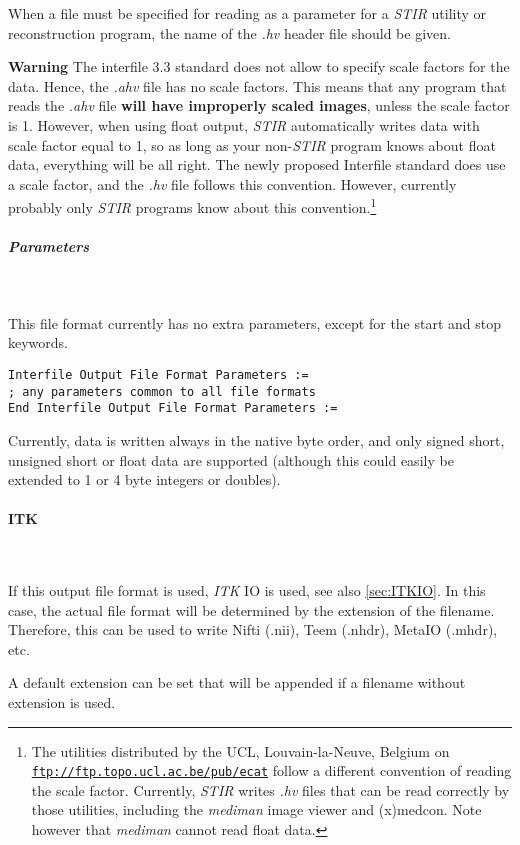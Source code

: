 \documentclass{article}
\def\url#1#2{\mbox{\href{#1}{\tt #2}}}
\newcommand{\subsubsubsection}[1]{\paragraph{#1}\mbox{} \\}
\newcommand{\subsubsubsubsection}[1]{\subparagraph{#1} \mbox{} \\}
\begin{document}
{{When a file must be specified for reading as a parameter for 
a \textit{STIR} utility or reconstruction program, the name of the \textit{.hv} 
header file should be given. 



\textbf{Warning} The interfile 3.3 standard does not allow to specify 
scale factors for the data. Hence, the \textit{.ahv} file has no scale 
factors. This means that any program that reads the \textit{.ahv} 
file \textbf{will have improperly scaled images}, unless the scale 
factor is 1. However, when using float output, \textit{STIR} automatically 
writes data with scale factor equal to 1, so as long as your 
non-\textit{STIR} program knows about float data, everything will 
be all right. The newly proposed Interfile standard does use 
a scale factor, and the \textit{.hv} file follows this convention. 
However, currently probably only \textit{STIR} programs know about 
this convention.\footnote{{\small The utilities distributed by the UCL, 
Louvain-la-Neuve, Belgium on \url{ftp://ftp.topo.ucl.ac.be/pub/ecat }{ftp://ftp.topo.ucl.ac.be/pub/ecat} 
follow a different convention of reading the scale factor. Currently, \textit{STIR} 
writes \textit{.hv} files that can be read correctly by those utilities, 
including the \textit{mediman} image viewer and (x)medcon. Note however 
that \textit{mediman} cannot read float data.}}

{ \subsubsubsubsection{Parameters}
}
This file format currently has no extra parameters, except for 
the start and stop keywords.

\begin{verbatim}
Interfile Output File Format Parameters :=
; any parameters common to all file formats
End Interfile Output File Format Parameters :=
\end{verbatim}

Currently, data is written always in the native byte order, and 
only signed short, unsigned short or float data are supported 
(although this could easily be extended to 1 or 4 byte integers 
or doubles).

{ \subsubsubsection{ITK}
}
If this output file format is used, \textit{ITK} IO is used, see also \ref{sec:ITKIO}. 
In this case, the actual file format will be determined by the extension of the filename.
Therefore, this can be used to write Nifti (.nii), Teem (.nhdr),
MetaIO (.mhdr), etc.

A default extension can be set that will be  appended if a filename without extension is used.

}}
\end{document}
